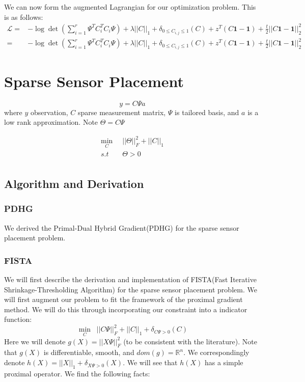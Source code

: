 \documentclass[12pt, letterpaper]{article}
\begin{document}
	 We can now form the augmented Lagrangian for our optimization problem. This is as follows:
	\begin{align*}
	\mathcal{L} =&   -\log \det \left(\sum_{i=1}^{r}\Psi ^{T}C_{i}^{T}C_{i}\Psi\right)
	+\lambda||C||_{1}+\delta_{0\leq C_{i,j}\leq 1}(C) + z^{T}(C\mathbf{1} -\mathbf{1}) +\frac{t}{2}||C\mathbf{1} -\mathbf{1}||_{2}^{2}  \\	
	=& -\log \det \left(\sum_{i=1}^{r}\Psi ^{T}C_{i}^{T}C_{i}\Psi\right)
	+\lambda||C||_{1}+\delta_{0\leq C_{i,j}\leq 1}(C) + z^{T}(C\mathbf{1} -\mathbf{1}) +\frac{t}{2}||C\mathbf{1} -\mathbf{1}||_{2}^{2}  
	\end{align*}
	\section{Sparse Sensor Placement}
	\[y=C\Psi a\]
	where $y$ observation, $C$ sparse measurement matrix, $\Psi$ is tailored basis, and $a$ is a low rank approximation. Note $\Theta = C\Psi$
	
	\begin{align*}
			 \min_{C}& \;\; ||\Theta||_{F}^2 + ||C||_{1} \\
			      s.t& \;\; \Theta > 0 \\
	\end{align*}
	
	\subsection{Algorithm and Derivation}
	\subsubsection{PDHG}
		We derived the Primal-Dual Hybrid Gradient(PDHG) for the sparse sensor placement problem.
	\subsubsection{FISTA}
	We will first describe the derivation and implementation of FISTA(Fast Iterative Shrinkage-Thresholding Algorithm) for the sparse sensor placement problem. We will first augment our problem to fit the framework of the proximal gradient method. We will do this through incorporating our constraint into a indicator function:
		\[	\min_{C} \;\; ||C\Psi||_{F}^{2} + ||C||_{1} +\delta_{C\Psi > 0}(C)\]
	Here we will denote $g(X) = ||X\Psi||_{F}^{2}$ (to be consistent with the literature). Note that $g(X)$ is differentiable, smooth, and $dom(g)=\mathbb{R}^{n}$. We correspondingly denote $h(X) = ||X||_{1} +\delta_{X\Psi>0}(X)$. We will see that $h(X)$ has a simple proximal operator.
	We find the following facts:
	
\end{document}
